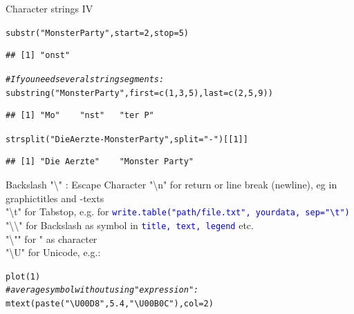 \documentclass[xcolor=table,       handout,    xcolor=dvipsnames]{beamer}\usepackage[]{graphicx}\usepackage[]{color}
\makeatletter
\newcommand{\hlnum}[1]{\textcolor[rgb]{0,0,0}{#1}}
\newcommand{\hlstr}[1]{\textcolor[rgb]{0.545,0.137,0.137}{#1}}
\newcommand{\hlcom}[1]{\textcolor[rgb]{0,0.392,0}{\textit{#1}}}
\newcommand{\hlstd}[1]{\textcolor[rgb]{0,0,0}{#1}}
\newcommand{\hlkwc}[1]{\textcolor[rgb]{1,0,1}{#1}}
\newcommand{\hlkwd}[1]{\textcolor[rgb]{0,0,1}{#1}}
\newenvironment{kframe}{%
 \def\at@end@of@kframe{}%
 \ifinner\ifhmode%
  \def\at@end@of@kframe{\end{minipage}}%
  \begin{minipage}{\columnwidth}%
 \fi\fi%
 \def\FrameCommand##1{\hskip\@totalleftmargin \hskip-\fboxsep
 \colorbox{shadecolor}{##1}\hskip-\fboxsep
     \hskip-\linewidth \hskip-\@totalleftmargin \hskip\columnwidth}%
 \MakeFramed {\advance\hsize-\width
   \@totalleftmargin\z@ \linewidth\hsize
   \@setminipage}}%
 {\par\unskip\endMakeFramed%
 \at@end@of@kframe}
\newenvironment{knitrout}{}{} %
\newcommand{\rcode}[1]{\texttt{\textcolor{Blue}{#1}}} %
\makeatother
\begin{document}
\begin{frame}[fragile]{Character strings IV}
\begin{knitrout}
\color{fgcolor}\begin{kframe}
\begin{alltt}
\hlkwd{substr}\hlstd{(}\hlstr{"Monster Party"}\hlstd{,} \hlkwc{start}\hlstd{=}\hlnum{2}\hlstd{,} \hlkwc{stop}\hlstd{=}\hlnum{5}\hlstd{)}
\end{alltt}
\begin{verbatim}
## [1] "onst"
\end{verbatim}
\begin{alltt}
\hlcom{# If you need several string segments:}
\hlkwd{substring}\hlstd{(}\hlstr{"Monster Party"}\hlstd{,} \hlkwc{first}\hlstd{=}\hlkwd{c}\hlstd{(}\hlnum{1}\hlstd{,}\hlnum{3}\hlstd{,}\hlnum{5}\hlstd{),} \hlkwc{last}\hlstd{=}\hlkwd{c}\hlstd{(}\hlnum{2}\hlstd{,}\hlnum{5}\hlstd{,}\hlnum{9}\hlstd{) )}
\end{alltt}
\begin{verbatim}
## [1] "Mo"    "nst"   "ter P"
\end{verbatim}
\begin{alltt}
\hlkwd{strsplit}\hlstd{(}\hlstr{"Die Aerzte - Monster Party"}\hlstd{,} \hlkwc{split}\hlstd{=}\hlstr{" - "}\hlstd{)[[}\hlnum{1}\hlstd{]]}
\end{alltt}
\begin{verbatim}
## [1] "Die Aerzte"    "Monster Party"
\end{verbatim}
\end{kframe}
\end{knitrout}
\end{frame}


\begin{frame}[fragile]{Backslash "\textbackslash" : Escape Character}
"\textbackslash n" for return or line break (newline), eg in graphictitles and -texts\\
"\textbackslash t" for Tabstop, e.g. for \rcode{write.table("path/file.txt", yourdata, sep="\textbackslash t")}\\
"\textbackslash \textbackslash" for Backslash as symbol in \rcode{title, text, legend} etc.\\
"\textbackslash "" for " as character\\
"\textbackslash U" for Unicode, e.g.:
\begin{knitrout}
\color{fgcolor}\begin{kframe}
\begin{alltt}
\hlkwd{plot}\hlstd{(}\hlnum{1}\hlstd{)}
\hlcom{# average symbol without using "expression":}
\hlkwd{mtext}\hlstd{(}\hlkwd{paste}\hlstd{(}\hlstr{"\textbackslash{}U00D8"}\hlstd{,} \hlnum{5.4}\hlstd{,} \hlstr{"\textbackslash{}U00B0 C"}\hlstd{),} \hlkwc{col}\hlstd{=}\hlnum{2}\hlstd{)}
\end{alltt}
\end{kframe}
\end{knitrout}
\end{frame}
\end{document}
